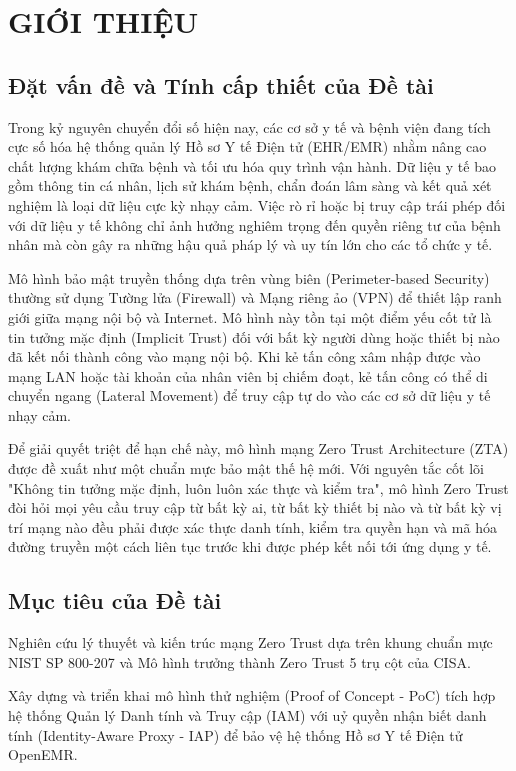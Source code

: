 \section{GIỚI THIỆU}

\subsection{Đặt vấn đề và Tính cấp thiết của Đề tài}

Trong kỷ nguyên chuyển đổi số hiện nay, các cơ sở y tế và bệnh viện đang tích cực số hóa hệ thống quản lý Hồ sơ Y tế Điện tử (EHR/EMR) nhằm nâng cao chất lượng khám chữa bệnh và tối ưu hóa quy trình vận hành. Dữ liệu y tế bao gồm thông tin cá nhân, lịch sử khám bệnh, chẩn đoán lâm sàng và kết quả xét nghiệm là loại dữ liệu cực kỳ nhạy cảm. Việc rò rỉ hoặc bị truy cập trái phép đối với dữ liệu y tế không chỉ ảnh hưởng nghiêm trọng đến quyền riêng tư của bệnh nhân mà còn gây ra những hậu quả pháp lý và uy tín lớn cho các tổ chức y tế.

Mô hình bảo mật truyền thống dựa trên vùng biên (Perimeter-based Security) thường sử dụng Tường lửa (Firewall) và Mạng riêng ảo (VPN) để thiết lập ranh giới giữa mạng nội bộ và Internet. Mô hình này tồn tại một điểm yếu cốt tử là tin tưởng mặc định (Implicit Trust) đối với bất kỳ người dùng hoặc thiết bị nào đã kết nối thành công vào mạng nội bộ. Khi kẻ tấn công xâm nhập được vào mạng LAN hoặc tài khoản của nhân viên bị chiếm đoạt, kẻ tấn công có thể di chuyển ngang (Lateral Movement) để truy cập tự do vào các cơ sở dữ liệu y tế nhạy cảm.

Để giải quyết triệt để hạn chế này, mô hình mạng Zero Trust Architecture (ZTA) được đề xuất như một chuẩn mực bảo mật thế hệ mới. Với nguyên tắc cốt lõi "Không tin tưởng mặc định, luôn luôn xác thực và kiểm tra", mô hình Zero Trust đòi hỏi mọi yêu cầu truy cập từ bất kỳ ai, từ bất kỳ thiết bị nào và từ bất kỳ vị trí mạng nào đều phải được xác thực danh tính, kiểm tra quyền hạn và mã hóa đường truyền một cách liên tục trước khi được phép kết nối tới ứng dụng y tế.

\subsection{Mục tiêu của Đề tài}

Nghiên cứu lý thuyết và kiến trúc mạng Zero Trust dựa trên khung chuẩn mực NIST SP 800-207 và Mô hình trưởng thành Zero Trust 5 trụ cột của CISA.

Xây dựng và triển khai mô hình thử nghiệm (Proof of Concept - PoC) tích hợp hệ thống Quản lý Danh tính và Truy cập (IAM) với uỷ quyền nhận biết danh tính (Identity-Aware Proxy - IAP) để bảo vệ hệ thống Hồ sơ Y tế Điện tử OpenEMR.


